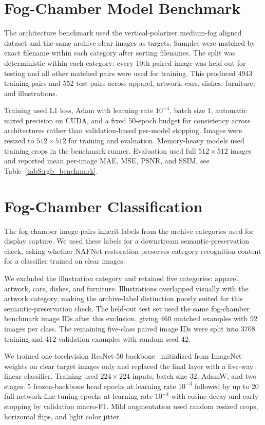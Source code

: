 \documentclass[9pt]{osa-supplemental-document}
\begin{document}
\section{Fog-Chamber Model Benchmark}

The architecture benchmark used the vertical-polarizer medium-fog aligned dataset and the same archive clear images as targets. Samples were matched by exact filename within each category after sorting filenames. The split was deterministic within each category: every 10th paired image was held out for testing and all other matched pairs were used for training. This produced 4943 training pairs and 552 test pairs across apparel, artwork, cars, dishes, furniture, and illustrations.

Training used L1 loss, Adam with learning rate $10^{-4}$, batch size 1, automatic mixed precision on CUDA, and a fixed 50-epoch budget for consistency across architectures rather than validation-based per-model stopping. Images were resized to $512 \times 512$ for training and evaluation. Memory-heavy models used training crops in the benchmark runner. Evaluation used full $512 \times 512$ images and reported mean per-image MAE, MSE, PSNR, and SSIM, see Table~\ref{tabS:rgb_benchmark}.


\FloatBarrier


\section{Fog-Chamber Classification}

The fog-chamber image pairs inherit labels from the archive categories used for display capture. We used these labels for a downstream semantic-preservation check, asking whether NAFNet restoration preserves category-recognition content for a classifier trained on clear images.

We excluded the illustration category and retained five categories: apparel, artwork, cars, dishes, and furniture. Illustrations overlapped visually with the artwork category, making the archive-label distinction poorly suited for this semantic-preservation check. The held-out test set used the same fog-chamber benchmark image IDs after this exclusion, giving 460 matched examples with 92 images per class. The remaining five-class paired image IDs were split into 3708 training and 412 validation examples with random seed 42.

We trained one torchvision ResNet-50 backbone~\cite{he2016deep} initialized from ImageNet weights on clear target images only and replaced the final layer with a five-way linear classifier. Training used $224 \times 224$ inputs, batch size 32, AdamW, and two stages: 5 frozen-backbone head epochs at learning rate $10^{-3}$ followed by up to 20 full-network fine-tuning epochs at learning rate $10^{-4}$ with cosine decay and early stopping by validation macro-F1. Mild augmentation used random resized crops, horizontal flips, and light color jitter.
\end{document}
